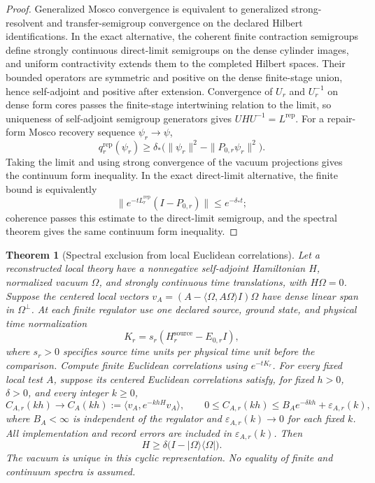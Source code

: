 \documentclass[11pt]{article}
\numberwithin{equation}{section}
\newtheorem{theorem}{Theorem}[section]
\theoremstyle{remark}
\newcommand{\Rep}{\mathrm{rep}}
\begin{document}
\begin{proof}
Generalized Mosco convergence is equivalent to generalized strong-resolvent and
transfer-semigroup convergence on the declared Hilbert identifications. In the exact alternative,
the coherent finite contraction semigroups define strongly continuous direct-limit semigroups on
the dense cylinder images, and uniform contractivity extends them to the completed Hilbert
spaces. Their bounded operators are symmetric and positive on the dense finite-stage union, hence
self-adjoint and positive after extension. Convergence of \(U_r\)
and \(U_r^{-1}\) on dense form cores passes the finite-stage intertwining relation to the limit,
so uniqueness of self-adjoint semigroup generators gives \(UHU^{-1}=L^{\mathrm{rep}}\). For a
repair-form Mosco recovery sequence \(\psi_r\to\psi\),
\[
q_r^{\mathrm{rep}}(\psi_r)
\ge \delta_*\bigl(\|\psi_r\|^2-\|P_{0,r}\psi_r\|^2\bigr).
\]
Taking the limit and using strong convergence of the vacuum projections gives the continuum form
inequality. In the exact direct-limit alternative, the finite bound is equivalently
\[
\|e^{-tL_r^{\Rep}}(I-P_{0,r})\|\le e^{-\delta_*t};
\]
coherence passes this estimate to the direct-limit semigroup, and the spectral theorem gives the
same continuum form inequality.
\end{proof}

\begin{theorem}[Spectral exclusion from local Euclidean correlations]
\label{thm:local-correlation-gap}
Let a reconstructed local theory have a nonnegative self-adjoint Hamiltonian
\(H\), normalized vacuum \(\Omega\), and strongly continuous time translations,
with \(H\Omega=0\). Suppose the centered local vectors
\(v_A=(A-\langle\Omega,A\Omega\rangle I)\Omega\) have dense linear span in
\(\Omega^\perp\). At each finite regulator use one declared source, ground state,
and physical time normalization
\[
K_r=s_r(H_r^{\mathrm{source}}-E_{0,r}I),
\]
where \(s_r>0\) specifies source time units per physical time unit before the
comparison. Compute finite Euclidean correlations using \(e^{-tK_r}\).
For every fixed local test \(A\), suppose its
centered Euclidean correlations satisfy, for fixed \(h>0\), \(\delta>0\), and
every integer \(k\ge0\),
\[
C_{A,r}(kh)\longrightarrow
C_A(kh):=\langle v_A,e^{-khH}v_A\rangle,
\qquad
0\le C_{A,r}(kh)\le B_Ae^{-\delta kh}+\varepsilon_{A,r}(k),
\]
where \(B_A<\infty\) is independent of the regulator and
\(\varepsilon_{A,r}(k)\to0\) for each fixed \(k\). All implementation and
record errors are included in \(\varepsilon_{A,r}(k)\). Then
\[
H\ge\delta\bigl(I-|\Omega\rangle\langle\Omega|\bigr).
\]
The vacuum is unique in this cyclic representation. No equality of finite
and continuum spectra is assumed.
\end{theorem}
\end{document}
